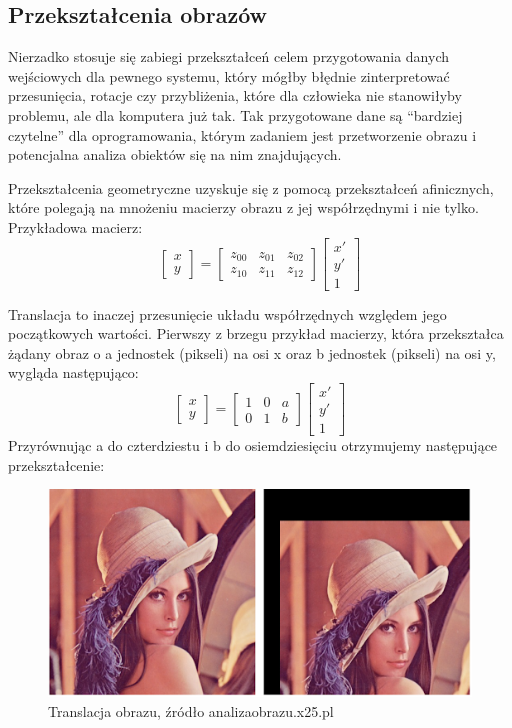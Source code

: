 \documentclass{article}
\begin{document}
	\subsection{Przekształcenia obrazów}
	\par
	Nierzadko stosuje się zabiegi przekształceń celem przygotowania danych wejściowych dla pewnego systemu, który mógłby błędnie zinterpretować przesunięcia, rotacje czy przybliżenia, które dla człowieka nie stanowiłyby problemu, ale dla komputera już tak. Tak przygotowane dane są “bardziej czytelne” dla oprogramowania, którym zadaniem jest przetworzenie obrazu i potencjalna analiza obiektów się na nim znajdujących.
	\par
	Przekształcenia geometryczne uzyskuje się z pomocą przekształceń afinicznych, które polegają na mnożeniu macierzy obrazu z jej współrzędnymi i nie tylko. Przykładowa macierz:
	\[
	\begin{bmatrix}
		x\\
		y
	\end{bmatrix}
	=
	\begin{bmatrix}
		z_{00} & z_{01} & z_{02}\\
		z_{10} & z_{11} & z_{12}
	\end{bmatrix}
	\begin{bmatrix}
		x'\\
		y'\\
		1
	\end{bmatrix}
	\]
	\par
	Translacja to inaczej przesunięcie układu współrzędnych względem jego początkowych wartości. Pierwszy z brzegu przykład macierzy, która przekształca żądany obraz o a jednostek (pikseli) na osi x oraz b jednostek (pikseli) na osi y, wygląda następująco:
	\[
	\begin{bmatrix}
		x\\
		y
	\end{bmatrix}
	=
	\begin{bmatrix}
		1 & 0 & a\\
		0 & 1 & b
	\end{bmatrix}
	\begin{bmatrix}
		x'\\
		y'\\
		1
	\end{bmatrix}
	\]
	Przyrównując a do czterdziestu i b do osiemdziesięciu otrzymujemy następujące przekształcenie:
	\begin{figure}
		\centering
		\includegraphics[width=15cm]{translation}
		\caption{Translacja obrazu, źródło analizaobrazu.x25.pl}
	\end{figure}
\end{document}
